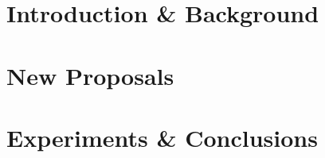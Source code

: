 \documentclass[ twoside,openright,titlepage,numbers=noenddot,headinclude,%
                footinclude=true,cleardoublepage=empty,abstractoff, %
                BCOR=5mm,paper=a4,fontsize=11pt,%
                american,%
                ]{scrreprt}
\begin{document}
	\frenchspacing
	\raggedbottom
	\pagestyle{plain}
	
	
	
	\cleardoublepage
	\cleardoublepage
	\cleardoublepage
	\cleardoublepage
	\cleardoublepage
	\cleardoublepage
	\cleardoublepage
	\pagestyle{scrheadings}
	\cleardoublepage
	\part{Introduction \& Background}\label{pt:introduction}
	
	
	
	\part{New Proposals}\label{pt:NewProposals}
	
	\part{Experiments \& Conclusions}\label{pt:Experiments}
	
	
	
	



	\cleardoublepage
	\cleardoublepage
	\cleardoublepage
\end{document}

